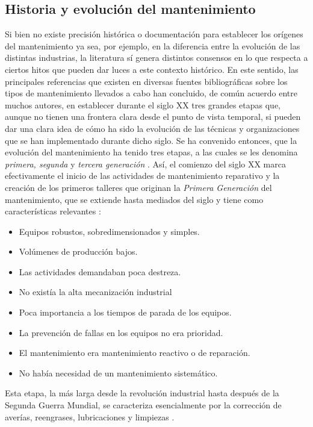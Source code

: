 \subsection{Historia y evolución del mantenimiento}

Si bien no existe precisión histórica o documentación para establecer los orígenes del mantenimiento ya sea, por ejemplo, en la diferencia entre la evolución de las distintas industrias, la literatura sí genera distintos consensos en lo que respecta a ciertos hitos que pueden dar luces a este contexto histórico. En este sentido, las principales referencias que existen en diversas fuentes bibliográficas sobre los tipos de mantenimiento llevados a cabo han concluido, de común acuerdo entre muchos autores, en establecer durante el siglo XX tres grandes etapas que, aunque no tienen una frontera clara desde el punto de vista temporal, si pueden dar una clara idea de cómo ha sido la evolución de las técnicas y organizaciones que se han implementado durante dicho siglo. Se ha convenido entonces, que la evolución del mantenimiento ha tenido tres etapas, a las cuales se les denomina \textit{primera, segunda} y \textit{tercera generación} \parencite{gonzalez2005}.
Así, el comienzo del siglo XX marca efectivamente el inicio de las actividades de mantenimiento reparativo y la creación de los primeros talleres que originan la \textit{Primera Generación} del mantenimiento, que se extiende hasta mediados del siglo y tiene como características relevantes \parencite{garcia2012}:

\begin{itemize}
\item Equipos robustos, sobredimensionados y simples.
\item Volúmenes de producción bajos.
\item Las actividades demandaban poca destreza.
\item No existía la alta mecanización industrial
\item Poca importancia a los tiempos de parada de los equipos.
\item La prevención de fallas en los equipos no era prioridad.
\item El mantenimiento era mantenimiento reactivo o de reparación.
\item No había necesidad de un mantenimiento sistemático.
\end{itemize}  

Esta etapa, la más larga desde la revolución industrial hasta después de la Segunda Guerra Mundial, se caracteriza esencialmente por la corrección de averías, reengrases, lubricaciones y limpiezas \parencite{gonzalez2005}.

